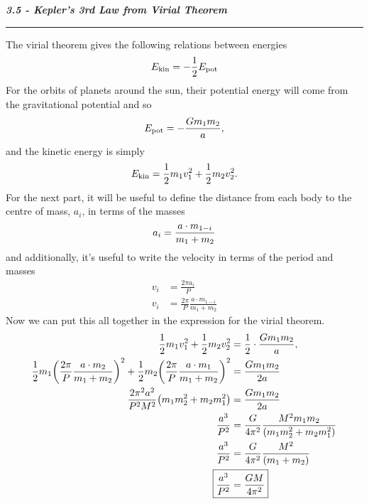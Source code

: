 \documentclass[12pt, letterpaper, twoside]{article}
\newcommand{\question}[1]{{\noindent \it #1}}
\newcommand{\answer}[1]{
    \par\noindent\rule{\textwidth}{0.4pt}#1\vspace{0.5cm}
}
\begin{document}
\question{\textbf{3.5 - Kepler's 3rd Law from Virial Theorem}}
\answer{
    The virial theorem gives the following relations between energies
    \begin{equation}
        E_{\rm kin} = - \frac{1}{2} E_{\rm pot}
    \end{equation}
    For the orbits of planets around the sun, their potential energy will come from the gravitational potential and so
    \begin{equation}
        E_{\rm pot} = - \frac{G m_1 m_2}{a},
    \end{equation}
    and the kinetic energy is simply
    \begin{equation}
        E_{\rm kin} = \frac{1}{2} m_1 v_1^2 + \frac{1}{2} m_2 v_2^2.
    \end{equation}
    For the next part, it will be useful to define the distance from each body to the centre of mass, $a_i$, in terms of the masses
    \begin{equation}
        a_i = \frac{a \cdot m_{1 - i}}{m_1 + m_2} \\
    \end{equation}
    and additionally, it's useful to write the velocity in terms of the period and masses
    \begin{align}
        v_i &= \frac{2 \pi a_i}{P} \\
        v_i &= \frac{2 \pi}{P} \frac{a \cdot m_{1 - i}}{m_1 + m_2}
    \end{align}
    Now we can put this all together in the expression for the virial theorem.
    \begin{align}
        \frac{1}{2} m_1 v_1^2 + \frac{1}{2} m_2 v_2^2 &= \frac{1}{2} \cdot \frac{G m_1 m_2}{a}, \\
        \frac{1}{2} m_1 \qty(\frac{2 \pi}{P} \frac{a \cdot m_2}{m_1 + m_2})^2 + \frac{1}{2} m_2  \qty(\frac{2 \pi}{P} \frac{a \cdot m_1}{m_1 + m_2})^2 &= \frac{G m_1 m_2}{2 a} \\
        \frac{2 \pi^2 a^2}{P^2 M^2} \qty( m_1 m_2^2 + m_2 m_1^2 ) &= \frac{G m_1 m_2}{2 a} \\
        \frac{a^3}{P^2} &= \frac{G}{4 \pi^2} \frac{M^2 m_1 m_2}{\qty( m_1 m_2^2 + m_2 m_1^2 )} \\
        \frac{a^3}{P^2} &= \frac{G}{4 \pi^2} \frac{M^2}{\qty( m_1 + m_2 )} \\
        \Aboxed{ \frac{a^3}{P^2} &= \frac{G M}{4 \pi^2} }
    \end{align}
}
\end{document}
